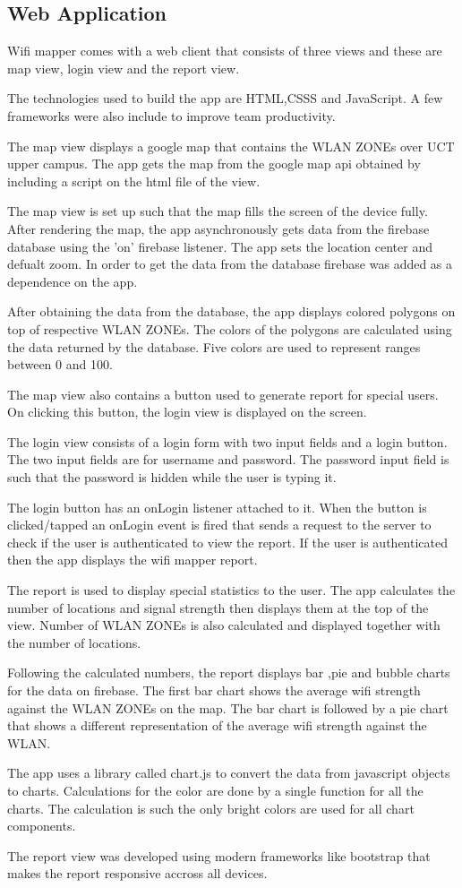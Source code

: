 \subsection*{Web Application}
Wifi mapper comes with a web client that consists of three views and these are map view, login view and the report view.  

The technologies used to build the app are HTML,CSSS and JavaScript. A few frameworks were also include to improve team productivity.

The map view displays a google map that contains the WLAN ZONEs over UCT upper campus. The app gets the map from the google map api obtained by including a script on the html file of the view.

The map view is set up such that the map fills the screen of the device fully. After rendering the map, the app asynchronously gets data from the firebase database using the 'on' firebase listener. The app sets the location center and defualt zoom. In order to get the data from the database firebase was added as a dependence on the app. 

After obtaining the data from the database, the app displays colored polygons on top of respective WLAN ZONEs. The colors of the polygons are calculated using the data returned by the database. Five colors are used to represent ranges between 0 and 100. 

The map view also contains a button used to generate report for special users. On clicking this button, the login view is displayed on the screen.

The login view consists of a login form with two input fields and a login button. The two input fields are for username and password. The password input field is such that the password is hidden while the user is typing it. 

The login button has an onLogin listener attached to it. When the button is clicked/tapped an onLogin event is fired that sends a request to the server to check if the user is authenticated to view the report. If the user is authenticated then the app displays the wifi mapper report.

The report is used to display special statistics to the user. The app calculates the number of locations and signal strength then displays them at the top of the view. Number of WLAN ZONEs is also calculated and displayed together with the number of locations.

Following the calculated numbers, the report displays bar ,pie and bubble charts for the data on firebase. The first bar chart shows the average wifi strength against the WLAN ZONEs on the map. The bar chart is followed by a pie chart that shows a different representation of the average wifi strength against the WLAN.

The app uses a library called chart.js to convert the data from javascript objects to charts. Calculations for the color are done by a single function for all the charts. The calculation is such the only bright colors are used for all chart components.

The report view was developed using modern frameworks like bootstrap that makes the report responsive accross all devices.

